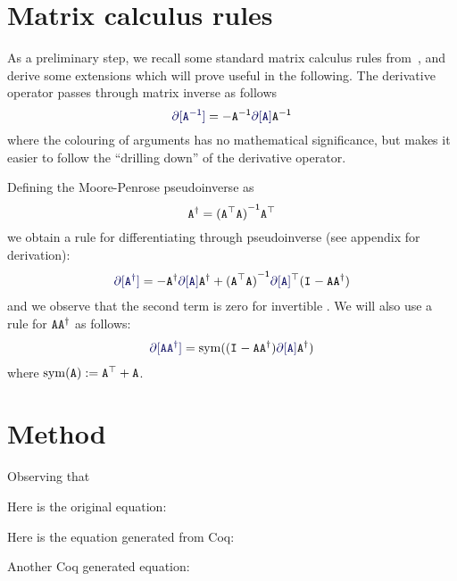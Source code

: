 \documentclass[runningheads]{llncs}
\def\eqlabel#1{\label{eq:#1}}
\def\tr{^\top}
\begin{document}
\section{Matrix calculus rules}
As a preliminary step, we recall some standard matrix calculus rules from~\cite{minka00}, and derive some extensions which will prove useful in the following.   The derivative operator passes through matrix inverse as follows
\begin{equation}
\diff[\inv \mA] = -\inv \mA \diff[\mA] \inv \mA
\end{equation}
where the colouring of arguments has no mathematical significance, but makes it easier to follow the ``drilling down'' of the derivative operator.  

Defining the Moore-Penrose pseudoinverse as
\begin{equation}
\pinv \mA = \inv{(\mA\tr \mA)}\mA\tr
\end{equation}
we obtain a rule for differentiating through pseudoinverse (see appendix for derivation):
\begin{align}
\diff[\pinv \mA] = -\pinv \mA \diff[\mA] \pinv \mA +
\inv{(\mA\tr\mA)}\diff[\mA]\tr(\Id{}-\mA\pinv\mA)
\eqlabel{diffpinv}
\end{align}
and we observe that the second term is zero for invertible \mA.  We will also use a rule for $\mathtt{A} {{\mathtt{A}}^\dagger}$ as follows:
\begin{align}
\diff[\mA \pinv \mA] = \sym((\Id{} - \mA\pinv \mA) \diff[\mA] \pinv \mA)
\end{align}
where $\sym(\mA) := \mA\tr + \mA$. 


\section{Method}
Observing that 

Here is the original equation:

Here is the equation generated from Coq:
\vecdot

Another Coq generated equation:
\tovecdot
\end{document}
